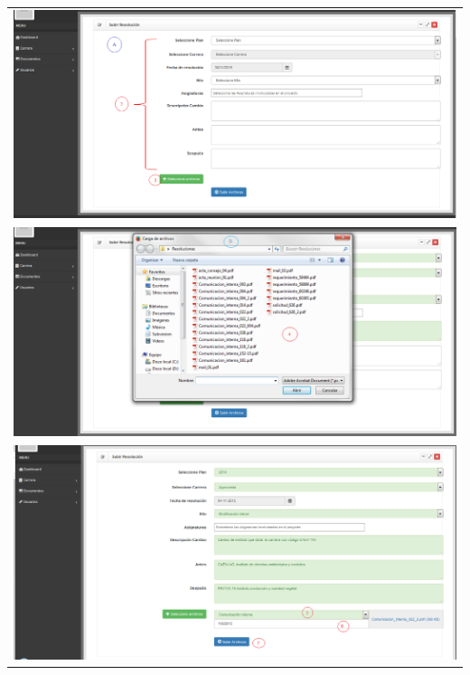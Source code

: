 \begin{longtable}{p{7cm}| p{7cm}}
				\multicolumn{2}{c}{\includegraphics[width=1\textwidth]{images/Capitulo_3/subir_documento2.png}} \\ 
				
				\multicolumn{2}{c}{\includegraphics[width=1\textwidth]{images/Capitulo_3/subir_documento3.png}} \\ 
				
				\multicolumn{2}{c}{\includegraphics[width=1\textwidth]{images/Capitulo_3/subir_documento5.png}} \\ 
				

\end{longtable}
